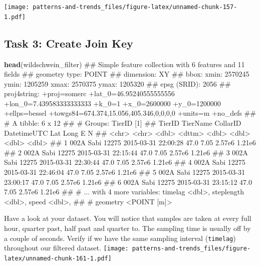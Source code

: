\documentclass[]{book}
\newenvironment{Shaded}{\begin{snugshade}}{\end{snugshade}}
\newcommand{\KeywordTok}[1]{\textcolor[rgb]{0.13,0.29,0.53}{\textbf{#1}}}
\newcommand{\StringTok}[1]{\textcolor[rgb]{0.31,0.60,0.02}{#1}}
\newcommand{\OperatorTok}[1]{\textcolor[rgb]{0.81,0.36,0.00}{\textbf{#1}}}
\newcommand{\NormalTok}[1]{#1}
\begin{document}
\texttt{[image: patterns-and-trends\_files/figure-latex/unnamed-chunk-157-1.pdf]}

\begin{Shaded}
\end{Shaded}

\subsection{Task 3: Create Join Key}\label{task-3-create-join-key}

\begin{Shaded}
\begin{Highlighting}[]
\KeywordTok{head}\NormalTok{(wildschwein_filter)}
\NormalTok{## Simple feature collection with 6 features and 11 fields}
\NormalTok{## geometry type:  POINT}
\NormalTok{## dimension:      XY}
\NormalTok{## bbox:           xmin: 2570245 ymin: 1205259 xmax: 2570375 ymax: 1205320}
\NormalTok{## epsg (SRID):    2056}
\NormalTok{## proj4string:    +proj=somerc +lat_0=46.95240555555556 +lon_0=7.439583333333333 +k_0=1 +x_0=2600000 +y_0=1200000 +ellps=bessel +towgs84=674.374,15.056,405.346,0,0,0,0 +units=m +no_defs}
\NormalTok{## # A tibble: 6 x 12}
\NormalTok{## # Groups:   TierID [1]}
\NormalTok{##   TierID TierName CollarID DatetimeUTC           Lat  Long      E      N}
\NormalTok{##   <chr>  <chr>       <dbl> <dttm>              <dbl> <dbl>  <dbl>  <dbl>}
\NormalTok{## 1 002A   Sabi        12275 2015-03-31 22:00:28  47.0  7.05 2.57e6 1.21e6}
\NormalTok{## 2 002A   Sabi        12275 2015-03-31 22:15:44  47.0  7.05 2.57e6 1.21e6}
\NormalTok{## 3 002A   Sabi        12275 2015-03-31 22:30:44  47.0  7.05 2.57e6 1.21e6}
\NormalTok{## 4 002A   Sabi        12275 2015-03-31 22:46:04  47.0  7.05 2.57e6 1.21e6}
\NormalTok{## 5 002A   Sabi        12275 2015-03-31 23:00:17  47.0  7.05 2.57e6 1.21e6}
\NormalTok{## 6 002A   Sabi        12275 2015-03-31 23:15:12  47.0  7.05 2.57e6 1.21e6}
\NormalTok{## # ... with 4 more variables: timelag <dbl>, steplength <dbl>, speed <dbl>,}
\NormalTok{## #   geometry <POINT [m]>}
\end{Highlighting}
\end{Shaded}

Have a look at your dataset. You will notice that samples are taken at
every full hour, quarter past, half past and quarter to. The sampling
time is usually off by a couple of seconds. Verify if we have the same
sampling interval (\texttt{timelag}) throughout our filtered dataset.
\texttt{[image: patterns-and-trends\_files/figure-latex/unnamed-chunk-161-1.pdf]}
\end{document}
